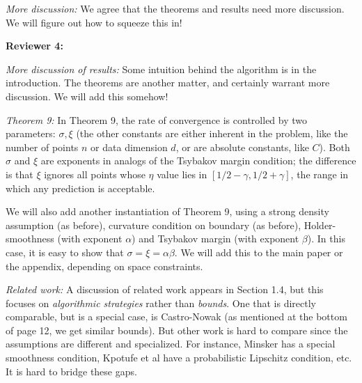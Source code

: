 \documentclass[12pt]{colt2023} %
\begin{document}
\noindent
\emph{More discussion:} We agree that the theorems and results need more discussion. We will figure out how to squeeze this in!

\vspace{.1in}
\noindent
{\bf Reviewer 4:} 

\noindent
\emph{More discussion of results:} Some intuition behind the algorithm is in the introduction. The theorems are another matter, and certainly warrant more discussion. We will add this somehow!

\noindent
\emph{Theorem 9:} In Theorem 9, the rate of convergence is controlled by two parameters: $\sigma, \xi$ (the other constants are either inherent in the problem, like the number of points $n$ or data dimension $d$, or are absolute constants, like $C$). Both $\sigma$ and $\xi$ are exponents in analogs of the Tsybakov margin condition; the difference is that $\xi$ ignores all points whose $\eta$ value lies in $[1/2-\gamma, 1/2+\gamma]$, the range in which any prediction is acceptable.

We will also add another instantiation of Theorem 9, using a strong density assumption (as before), curvature condition on boundary (as before), Holder-smoothness (with exponent $\alpha$) and Tsybakov margin (with exponent $\beta$). In this case, it is easy to show that $\sigma = \xi = \alpha\beta$. We will add this to the main paper or the appendix, depending on space constraints.

\noindent
\emph{Related work:} A discussion of related work appears in Section 1.4, but this focuses on \emph{algorithmic strategies} rather than \emph{bounds}. One that is directly comparable, but is a special case, is Castro-Nowak (as mentioned at the bottom of page 12, we get similar bounds). But other work is hard to compare since the assumptions are different and specialized. For instance, Minsker has a special smoothness condition, Kpotufe et al have a probabilistic Lipschitz condition, etc. It is hard to bridge these gaps.
\end{document}
